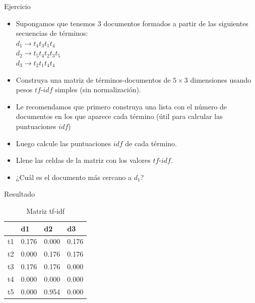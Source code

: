 \documentclass[handout]{beamer}
\begin{document}
\begin{frame}{Ejercicio}
\begin{itemize}
 \item Supongamos que tenemos $3$ documentos formados a partir de las siguientes secuencias de términos: \\
 $d_{1}\rightarrow t_{4}t_{3}t_{1}t_{4}$ \\
 $d_{2}\rightarrow t_{5}t_{4}t_{2}t_{3}t_{5}$ \\
 $d_{3}\rightarrow t_{2}t_{1}t_{4}t_{4}$ \\

\item Construya una matriz de términos-documentos de $5\times3$ dimensiones usando pesos $tf$-$idf$ simples (sin normalización).
\item  Le recomendamos que primero construya una lista con el número de documentos en los que aparece cada término (útil para calcular las puntuaciones $idf$)
\item Luego calcule las puntuaciones $idf$ de cada término.
\item Llene las celdas de la matriz con los valores $tf$-$idf$.
\item ¿Cuál es el documento más cercano a $d_{1}$?
\end{itemize}


\end{frame}

\begin{frame}{Resultado}
 \begin{table}[htbp]
\caption{Matriz tf-idf}
\begin{tabular}{|l|r|r|r|}
\hline
 & \multicolumn{1}{l|}{d1} & \multicolumn{1}{l|}{d2} & \multicolumn{1}{l|}{d3} \\ \hline
t1 & 0.176 & 0.000 & 0.176 \\ \hline
t2 & 0.000 & 0.176 & 0.176 \\ \hline
t3 & 0.176 & 0.176 & 0.000 \\ \hline
t4 & 0.000 & 0.000 & 0.000 \\ \hline
t5 & 0.000 & 0.954 & 0.000 \\ \hline
\end{tabular}
\end{table}

\end{frame}
\end{document}
